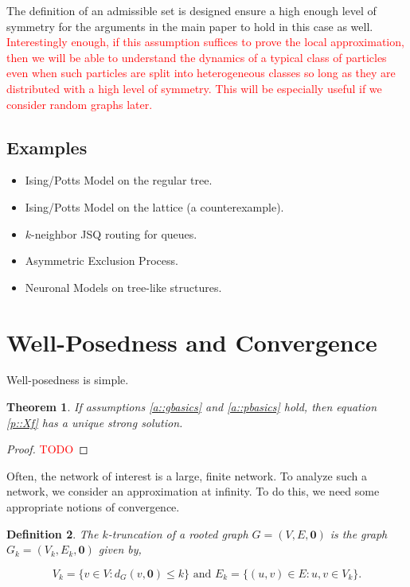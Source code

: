 \documentclass[12pt]{article}
\newcommand{\te}{\text}
\newcommand{\tr}{\textcolor{red}}
\renewcommand{\root}{\mathbf{0}}
\newcommand{\trnc}[1]{_{#1}}						%
\newtheorem{thms}{Theorem}[section]
\newtheorem{defn}[thms]{Definition}
\begin{document}
The definition of an admissible set is designed ensure a high enough level of symmetry for the arguments in the main paper to hold in this case as well. \tr{Interestingly enough, if this assumption suffices to prove the local approximation, then we will be able to understand the dynamics of a typical class of particles even when such particles are split into heterogeneous classes so long as they are distributed with a high level of symmetry. This will be especially useful if we consider random graphs later.}

\subsection{Examples}
\label{e::not}

\begin{itemize}
\item Ising/Potts Model on the regular tree.

\item Ising/Potts Model on the lattice (a counterexample).

\item \(k\)-neighbor JSQ routing for queues.

\item Asymmetric Exclusion Process.

\item Neuronal Models on tree-like structures.
\end{itemize}

\section{Well-Posedness and Convergence}
\label{WP}

Well-posedness is simple.

\begin{thms}
If assumptions \ref{a::gbasics} and \ref{a::pbasics} hold, then equation \eqref{p::Xf} has a unique strong solution.
\label{WP::WP}
\end{thms}
\begin{proof}
\tr{TODO}
\end{proof}

Often, the network of interest is a large, finite network. To analyze such a network, we consider an approximation at infinity. To do this, we need some appropriate notions of convergence.

\begin{defn}
The \(k\)-truncation of a rooted graph \(G = (V,E,\root)\) is the graph \(G\trnc{k}=(V\trnc{k},E\trnc{k},\root)\) given by,

\[V\trnc{k} = \{v \in V: d_G(v,\root) \leq k\} \te{ and } E\trnc{k} = \{(u,v) \in E: u,v \in V\trnc{k}\}.\]
\label{WP::trunc}
\end{defn}
\end{document}
